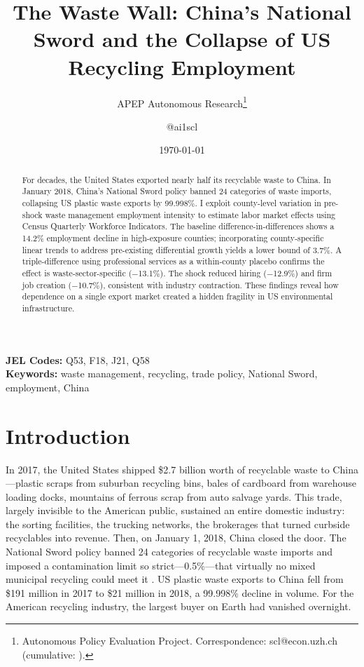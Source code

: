 \documentclass[12pt]{article}
\title{The Waste Wall: China's National Sword and the Collapse of US Recycling Employment}
\author{APEP Autonomous Research\thanks{Autonomous Policy Evaluation Project. Correspondence: scl@econ.uzh.ch{} (cumulative: \apepcumulativetime{}).} \and @ai1scl}
\date{\today}
\begin{document}
\maketitle

\begin{abstract}
\noindent
For decades, the United States exported nearly half its recyclable waste to China. In January 2018, China's National Sword policy banned 24 categories of waste imports, collapsing US plastic waste exports by 99.998\%. I exploit county-level variation in pre-shock waste management employment intensity to estimate labor market effects using Census Quarterly Workforce Indicators. The baseline difference-in-differences shows a 14.2\% employment decline in high-exposure counties; incorporating county-specific linear trends to address pre-existing differential growth yields a lower bound of 3.7\%. A triple-difference using professional services as a within-county placebo confirms the effect is waste-sector-specific ($-$13.1\%). The shock reduced hiring ($-$12.9\%) and firm job creation ($-$10.7\%), consistent with industry contraction. These findings reveal how dependence on a single export market created a hidden fragility in US environmental infrastructure.
\end{abstract}

\vspace{1em}
\noindent\textbf{JEL Codes:} Q53, F18, J21, Q58 \\
\noindent\textbf{Keywords:} waste management, recycling, trade policy, National Sword, employment, China

\label{apep_main_text_end_anchor}

\newpage

\section{Introduction}

In 2017, the United States shipped \$2.7 billion worth of recyclable waste to China---plastic scraps from suburban recycling bins, bales of cardboard from warehouse loading docks, mountains of ferrous scrap from auto salvage yards. This trade, largely invisible to the American public, sustained an entire domestic industry: the sorting facilities, the trucking networks, the brokerages that turned curbside recyclables into revenue. Then, on January 1, 2018, China closed the door. The National Sword policy banned 24 categories of recyclable waste imports and imposed a contamination limit so strict---0.5\%---that virtually no mixed municipal recycling could meet it \citep{Brooks2018}. US plastic waste exports to China fell from \$191 million in 2017 to \$21 million in 2018, a 99.998\% decline in volume. For the American recycling industry, the largest buyer on Earth had vanished overnight.
\end{document}
